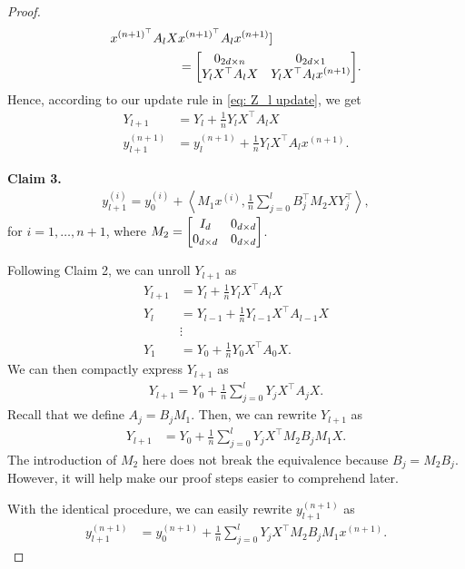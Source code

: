 \documentclass{article}
\newcommand{\indot}[2]{{\left<#1, #2\right>}}
\begin{document}
\begin{proof}
\begin{align}
                                 x^{(n+1)^\top} A_l X & x^{(n+1)^\top} A_l x^{(n+1)}]\\
        &= \mqty[0_{2d \times n} & 0_{2d \times 1}\\
                 Y_l X^\top A_l X & Y_l X^\top A_l x^{(n+1)}].
    \end{align}
    Hence, according to our update rule in \eqref{eq: Z_l update}, we get 
    \begin{align}
        Y_{l+1} &= Y_l + \frac{1}{n} Y_l X^\top A_l X\\
        y_{l+1}^{(n+1)} &= y_l^{(n+1)} + \frac{1}{n} Y_l X^\top A_l x^{(n+1)}.
    \end{align}

    \textbf{Claim 3.}
    \begin{align}
      y_{l+1}^{(i)} = y_0^{(i)} + \indot{M_1 x^{(i)}}{\frac{1}{n}\sum_{j=0}^l B_j^\top M_2 X Y_j^\top},
    \end{align}
    for $i = 1, \dots, n+1$, where $M_2 = \mqty[I_{d} & 0_{d\times d}\\ 0_{d\times d} & 0_{d\times d}]$.

    Following Claim 2, we can unroll $Y_{l+1}$ as
    \begin{align}
        Y_{l+1} &= Y_l + \frac{1}{n} Y_l X^\top A_l X\\
        Y_l &= Y_{l-1} + \frac{1}{n} Y_{l-1} X^\top A_{l-1} X\\
         &\vdots\\
        Y_1 & = Y_0 + \frac{1}{n} Y_0 X^\top A_0 X.
    \end{align}
    We can then compactly express $Y_{l+1}$ as
    \begin{align}
        Y_{l+1} = Y_0 + \frac{1}{n}\sum_{j=0}^l Y_j X^\top A_j X.
    \end{align}
    Recall that we define $A_j = B_j M_1$.
    Then, we can rewrite $Y_{l+1}$ as
    \begin{align}
        Y_{l+1} 
        &= Y_0 + \frac{1}{n} \sum_{j=0}^l Y_j X^\top M_2 B_j M_1 X.
    \end{align}
    The introduction of $M_2$ here does not break the equivalence because $B_j = M_2 B_j$.
    However, it will help make our proof steps easier to comprehend later.

    With the identical procedure, we can easily rewrite $y_{l+1}^{(n+1)}$ as
    \begin{align}
        y_{l+1}^{(n+1)} &= y_0^{(n+1)} + \frac{1}{n} \sum_{j=0}^l Y_j X^\top M_2 B_j M_1 x^{(n+1)}.
    \end{align}
    

\end{proof}
\end{document}
